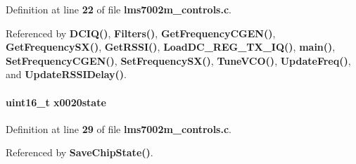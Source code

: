 Definition at line {\bf 22} of file {\bf lms7002m\+\_\+controls.\+c}.



Referenced by {\bf D\+C\+I\+Q()}, {\bf Filters()}, {\bf Get\+Frequency\+C\+G\+E\+N()}, {\bf Get\+Frequency\+S\+X()}, {\bf Get\+R\+S\+S\+I()}, {\bf Load\+D\+C\+\_\+\+R\+E\+G\+\_\+\+T\+X\+\_\+\+I\+Q()}, {\bf main()}, {\bf Set\+Frequency\+C\+G\+E\+N()}, {\bf Set\+Frequency\+S\+X()}, {\bf Tune\+V\+C\+O()}, {\bf Update\+Freq()}, and {\bf Update\+R\+S\+S\+I\+Delay()}.

\paragraph[{x0020state}]{\setlength{\rightskip}{0pt plus 5cm}uint16\+\_\+t x0020state}\label{lms7002m__controls_8c_a4af70aaad1912a9f1ed989ec731d36f2}


Definition at line {\bf 29} of file {\bf lms7002m\+\_\+controls.\+c}.



Referenced by {\bf Save\+Chip\+State()}.

